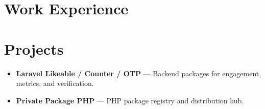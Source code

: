 \documentclass[11pt,a4paper]{article}
\begin{document}

\section*{Work Experience}

\section*{Projects}
\begin{itemize}
  \item \textbf{Laravel Likeable / Counter / OTP} --- Backend packages for engagement, metrics, and verification.
  \item \textbf{Private Package PHP} --- PHP package registry and distribution hub.
\end{itemize}

\end{document}
